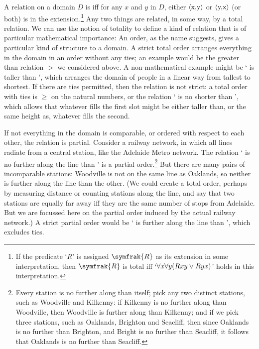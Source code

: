 A relation on a domain $D$ is  iff for any $x$ and $y$ in $D$, either $\mbox{\ensuremath{\mathopen{\langle}}x,y\ensuremath{\mathclose{\rangle}}}$ or $\mbox{\ensuremath{\mathopen{\langle}}y,x\ensuremath{\mathclose{\rangle}}}$ (or both) is in the extension.\footnote{If the predicate `$R$' is assigned $\symfrak{R}$ as its extension in some interpretation, then $\symfrak{R}$ is total iff `$\forall x \forall y (Rxy \vee Ryx)$' holds in this interpretation.} Any two things are related, in some way, by a total relation.  We can use the notion of totality to define a kind of relation that is of particular mathematical importance: 
An order, as the name suggests, gives a particular kind of structure to a domain. A strict total order arranges everything in the domain in an order without any ties; an example would be the greater than relation $>$ we considered above. A non-mathematical example might be ` is taller than ', which arranges the domain of people in a linear way from tallest to shortest. If there are ties permitted, then the relation is  not strict: a total order with ties is $≥$ on the natural numbers, or the relation ` is no shorter than ', which allows that whatever fills the first slot might be either taller than, or the same height as, whatever fills the second. 

If not everything in the domain is comparable, or ordered with respect to each other, the relation is partial. Consider a railway network, in which all lines radiate from a central station, like the Adelaide Metro network.  The relation ` is no further along the line than ' is a partial order.\footnote{Every station is no further along than itself; pick any two distinct stations, such as Woodville and Kilkenny: if Kilkenny is no further along than Woodville, then Woodville is further along than Kilkenny; and if we pick three stations, such as Oaklands, Brighton and Seacliff, then since Oaklands is no further than Brighton, and Bright is no further than Seacliff, it follows that Oaklands is no further than Seacliff.} But there are many pairs of incomparable stations: Woodville is not on the same line as Oaklands, so neither is further along the line than the other. (We could create a total order, perhaps by measuring distance or counting stations along the line, and say that two stations are equally far away iff they are the same number of stops from Adelaide. But we are focussed here on the partial order induced by the actual railway network.) A strict partial order would be ` is further along the line than ', which excludes ties. 

